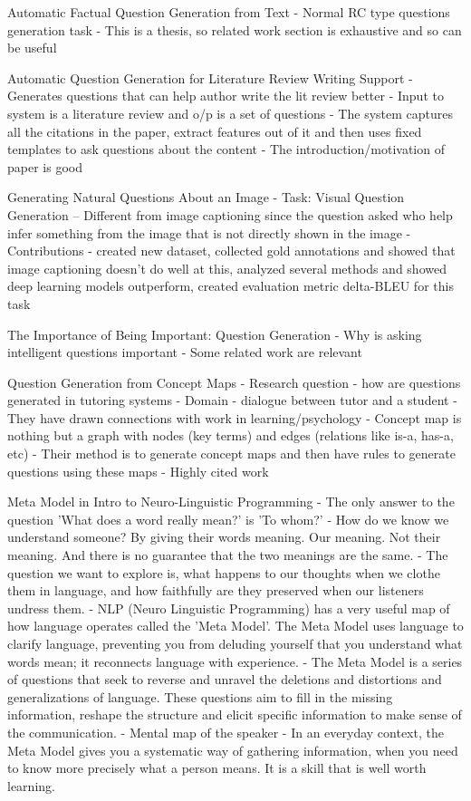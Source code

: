 \documentclass[11pt]{article}
\begin{document}
Automatic Factual Question Generation from Text 
- Normal RC type questions generation task
- This is a thesis, so related work section is exhaustive and so can be useful

Automatic Question Generation for Literature Review Writing Support
- Generates questions that can help author write the lit review better
- Input to system is a literature review and o/p is a set of questions
- The system captures all the citations in the paper, extract features out of it and then uses fixed templates to ask questions about the content
- The introduction/motivation of paper is good
						
Generating Natural Questions About an Image 
- Task: Visual Question Generation -- Different from image captioning since the question asked who help infer something from the image that is not directly shown in the image
- Contributions - created new dataset, collected gold annotations and showed that image captioning doesn't do well at this, analyzed several methods and showed deep learning models outperform, created evaluation metric delta-BLEU for this task
			
The Importance of Being Important: Question Generation 
- Why is asking intelligent questions important
- Some related work are relevant

Question Generation from Concept Maps
- Research question - how are questions generated in tutoring systems
- Domain - dialogue between tutor and a student
- They have drawn connections with work in learning/psychology
- Concept map is nothing but a graph with nodes (key terms) and edges (relations like is-a, has-a, etc)
- Their method is to generate concept maps and then have rules to generate questions using these maps
- Highly cited work

Meta Model in Intro to Neuro-Linguistic Programming
- The only answer to the question 'What does a word really mean?' is 'To whom?'
- How do we know we understand someone? By giving their words meaning. Our meaning. Not  their meaning. And there is no guarantee that the two meanings are the same.
- The question we want to explore is, what happens to our thoughts when we clothe them in language, and how faithfully are they preserved when our listeners undress them.
- NLP (Neuro Linguistic Programming) has a very useful map of how language operates called the 'Meta Model'. The Meta Model uses language to clarify language, preventing you from deluding yourself that you understand what words mean; it reconnects language with experience.
- The Meta Model is a series of questions that seek to reverse and unravel the deletions and distortions and generalizations of language. These questions aim to fill in the missing information, reshape the structure and elicit specific information to make sense of the communication.
- Mental map of the speaker
- In an everyday context, the Meta Model gives you a systematic way of gathering information, when you need to know more precisely what a person means. It is a skill that is well worth learning.
\end{document}
